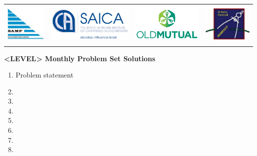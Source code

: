\documentclass{article}
\begin{document}
\setlength{\tabcolsep}{6pt}
\begin{center} \begin{tabular}{cccc}
	\includegraphics[height=56pt]{SAMF_logo.jpg} &
	\includegraphics[height=56pt]{SAICA_logo.jpg} &
	\includegraphics[height=56pt]{OM_Logo_Stacked_Vignette_on_White_RGB.jpg} &
	\includegraphics[height=56pt]{SAMO2019.png}
\end{tabular} \end{center}


\bigskip


\begin{center}
	\textbf{\Large <LEVEL> Monthly Problem Set Solutions}
\end{center}

\begin{enumerate}

\medskip
\item %
Problem statement


\medskip
\item


\medskip
\item


\medskip
\item


\medskip
\item


\medskip
\item


\medskip
\item


\medskip
\item


\end{enumerate}
\end{document}
